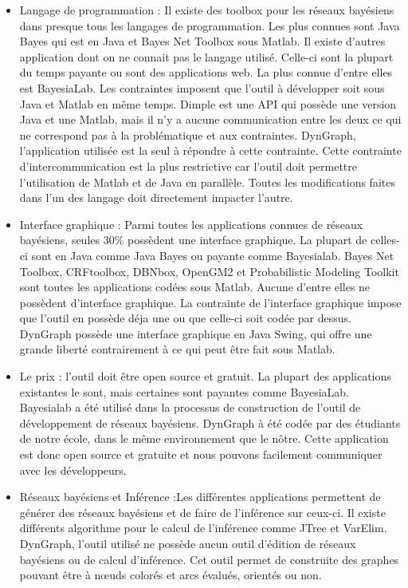 \documentclass[conference]{IEEEtran}
\begin{document}
\begin{itemize}
	\item{Langage de programmation :} Il existe des toolbox pour les réseaux bayésiens dans presque tous les langages de programmation. Les plus connues sont Java Bayes qui est en Java et Bayes Net Toolbox sous Matlab. Il existe d'autres application dont on ne connait pas le langage utilisé. Celle-ci sont la plupart du temps payante ou sont des applications web. La plus connue d'entre elles est BayesiaLab. Les contraintes imposent que l'outil à développer soit sous Java et Matlab en même temps. Dimple est une API qui possède une version Java et une Matlab, mais il n'y a aucune communication entre les deux ce qui ne correspond pas à la problématique et aux contraintes. DynGraph, l'application utilisée est la seul à répondre à cette contrainte. Cette contrainte d'intercommunication est la plus restrictive car l'outil doit permettre l'utilisation de Matlab et de Java en parallèle. Toutes les modifications faites dans l'un des langage doit directement impacter l'autre. \\
	
	\item{Interface graphique :} Parmi toutes les applications connues de réseaux bayésiens, seules 30\% possèdent une interface graphique. La plupart de celles-ci sont en Java comme Java Bayes ou payante comme Bayesialab. Bayes Net Toolbox, CRFtoolbox, DBNbox, OpenGM2 et Probabilistic Modeling Toolkit sont toutes les applications codées sous Matlab. Aucune d'entre elles ne possèdent d'interface graphique. La contrainte de l'interface graphique impose que l'outil en possède déja une ou que celle-ci soit codée par dessus. DynGraph possède une interface graphique en Java Swing, qui offre une grande liberté contrairement à ce qui peut être fait sous Matlab. \\

	\item{Le prix :} l'outil doit être open source et gratuit. La plupart des applications  existantes le sont, mais certaines sont payantes comme BayesiaLab. Bayesialab a été utilisé dans la processus de construction de l'outil de développement de réseaux bayésiens. DynGraph à été codée par des étudiants de notre école, dans le même environnement que le nôtre. Cette application est donc open source et gratuite et nous pouvons facilement communiquer avec les développeurs. \\
	
	\item{Réseaux bayésiens et Inférence :}Les différentes applications permettent de générer des réseaux bayésiens et de faire de l'inférence sur ceux-ci. Il existe différents algorithme pour le calcul de l'inférence comme JTree et VarElim. DynGraph, l'outil utilisé ne possède aucun outil d'édition de réseaux bayésiens ou de calcul d'inférence. Cet outil permet de construite des graphes pouvant être à nœuds colorés et arcs évalués, orientés ou non. \\
	
\end{itemize}
\end{document}
